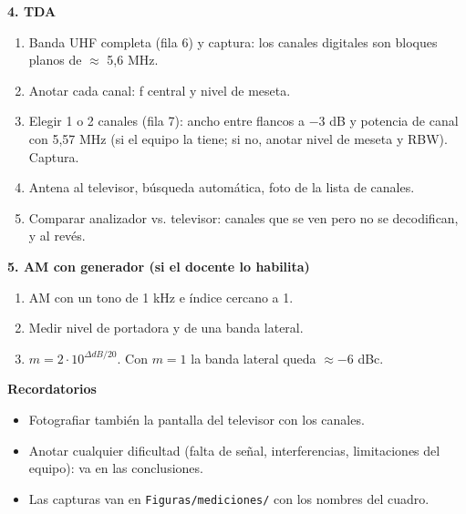 \documentclass[10pt]{article}
\newcommand{\archivo}[1]{\texttt{\small #1}}
\begin{document}
\begin{minipage}[t]{0.49\textwidth}
\textbf{4. TDA}
\begin{enumerate}
    \item Banda UHF completa (fila 6) y captura: los canales digitales son bloques planos de $\approx$ 5,6 MHz.
    \item Anotar cada canal: f central y nivel de meseta.
    \item Elegir 1 o 2 canales (fila 7): ancho entre flancos a $-3$ dB y potencia de canal con 5,57 MHz (si el equipo la tiene; si no, anotar nivel de meseta y RBW). Captura.
    \item Antena al televisor, búsqueda automática, foto de la lista de canales.
    \item Comparar analizador vs. televisor: canales que se ven pero no se decodifican, y al revés.
\end{enumerate}

\vspace{4pt}
\textbf{5. AM con generador (si el docente lo habilita)}
\begin{enumerate}
    \item AM con un tono de 1 kHz e índice cercano a 1.
    \item Medir nivel de portadora y de una banda lateral.
    \item $m = 2 \cdot 10^{\Delta dB/20}$. Con $m = 1$ la banda lateral queda $\approx -6$ dBc.
\end{enumerate}

\vspace{4pt}
\textbf{Recordatorios}
\begin{itemize}
    \item Fotografiar también la pantalla del televisor con los canales.
    \item Anotar cualquier dificultad (falta de señal, interferencias, limitaciones del equipo): va en las conclusiones.
    \item Las capturas van en \archivo{Figuras/mediciones/} con los nombres del cuadro.
\end{itemize}
\end{minipage}
\end{document}
